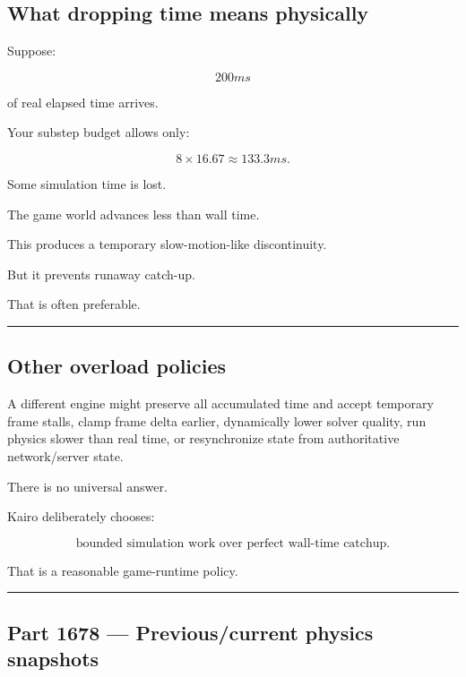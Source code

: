 \subsection{What dropping time means physically}\label{06-engine-ii-ch037-what-dropping-time-means-physically}

Suppose:

\[
200ms
\]

of real elapsed time arrives.

Your substep budget allows only:

\[
8\times16.67
\approx133.3ms.
\]

Some simulation time is lost.

The game world advances less than wall time.

This produces a temporary slow-motion-like discontinuity.

But it prevents runaway catch-up.

That is often preferable.

\begin{center}\rule{0.5\linewidth}{0.5pt}\end{center}

\subsection{Other overload policies}\label{06-engine-ii-ch037-other-overload-policies}

A different engine might preserve all accumulated time and accept temporary frame stalls, clamp frame delta earlier, dynamically lower solver quality, run physics slower than real time, or resynchronize state from authoritative network/server state.

There is no universal answer.

Kairo deliberately chooses:

\[
\boxed{
\text{bounded simulation work over perfect wall-time catchup}.
}
\]

That is a reasonable game-runtime policy.

\begin{center}\rule{0.5\linewidth}{0.5pt}\end{center}

\subsection{Part 1678 --- Previous/current physics snapshots}\label{06-engine-ii-ch037-part-1678-previouscurrent-physics-snapshots}

